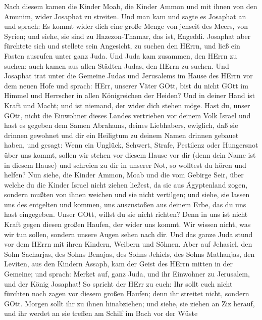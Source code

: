  Nach diesem kamen die Kinder Moab, die Kinder Ammon und mit
ihnen von den Amunim, wider Josaphat zu streiten.  Und man
kam und sagte es Josaphat an und sprach: Es kommt wider dich eine große
Menge von jenseit des Meers, von Syrien; und siehe, sie sind zu
Hazezon-Thamar, das ist, Engeddi.  Josaphat aber fürchtete
sich und stellete sein Angesicht, zu suchen den HErrn, und ließ ein
Fasten ausrufen unter ganz Juda.  Und Juda kam zusammen, den
HErrn zu suchen; auch kamen aus allen Städten Judas, den HErrn zu
suchen.  Und Josaphat trat unter die Gemeine Judas und
Jerusalems im Hause des HErrn vor dem neuen Hofe  und
sprach: HErr, unserer Väter GOtt, bist du nicht GOtt im Himmel und
Herrscher in allen Königreichen der Heiden? Und in deiner Hand ist Kraft
und Macht; und ist niemand, der wider dich stehen möge. 
Hast du, unser GOtt, nicht die Einwohner dieses Landes vertrieben vor
deinem Volk Israel und hast es gegeben dem Samen Abrahams, deines
Liebhabers, ewiglich,  daß sie drinnen gewohnet und dir ein
Heiligtum zu deinem Namen drinnen gebauet haben, und gesagt:
 Wenn ein Unglück, Schwert, Strafe, Pestilenz oder
Hungersnot über uns kommt, sollen wir stehen vor diesem Hause vor dir
(denn dein Name ist in diesem Hause) und schreien zu dir in unserer Not,
so wolltest du hören und helfen?  Nun siehe, die Kinder
Ammon, Moab und die vom Gebirge Seir, über welche du die Kinder Israel
nicht ziehen ließest, da sie aus Ägyptenland zogen, sondern mußten von
ihnen weichen und sie nicht vertilgen;  und siehe, sie
lassen uns des entgelten und kommen, uns auszustoßen aus deinem Erbe,
das du uns hast eingegeben.  Unser GOtt, willst du sie
nicht richten? Denn in uns ist nicht Kraft gegen diesen großen Haufen,
der wider uns kommt. Wir wissen nicht, was wir tun sollen, sondern
unsere Augen sehen nach dir.  Und das ganze Juda stund vor
dem HErrn mit ihren Kindern, Weibern und Söhnen.  Aber auf
Jehasiel, den Sohn Sacharjas, des Sohns Benajas, des Sohns Jehiels, des
Sohns Mathanjas, den Leviten, aus den Kindern Assaph, kam der Geist des
HErrn mitten in der Gemeine;  und sprach: Merket auf, ganz
Juda, und ihr Einwohner zu Jerusalem, und der König Josaphat! So spricht
der HErr zu euch: Ihr sollt euch nicht fürchten noch zagen vor diesem
großen Haufen; denn ihr streitet nicht, sondern GOtt. 
Morgen sollt ihr zu ihnen hinabziehen; und siehe, sie ziehen an Ziz
herauf, und ihr werdet an sie treffen am Schilf im Bach vor der Wüste
